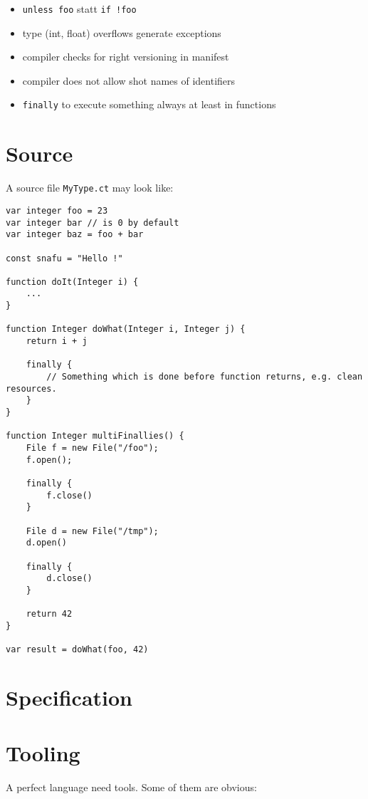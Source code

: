 \documentclass[11pt,a4paper]{report}
\begin{document}
\begin{itemize}
    \item \texttt{unless foo} statt \texttt{if !foo}
    \item type (int, float) overflows generate exceptions
    \item compiler checks for right versioning in manifest
    \item compiler does not allow shot names of identifiers
    \item \texttt{finally} to execute something always at least in functions
\end{itemize}

\section{Source}

A source file \texttt{MyType.ct} may look like:

\begin{lstlisting}[language=CayThe]
var integer foo = 23
var integer bar // is 0 by default
var integer baz = foo + bar

const snafu = "Hello !"

function doIt(Integer i) {
    ...
}

function Integer doWhat(Integer i, Integer j) {
    return i + j
    
    finally {
        // Something which is done before function returns, e.g. clean resources.
    }
}

function Integer multiFinallies() {
    File f = new File("/foo");
    f.open();

    finally {
        f.close()
    }

    File d = new File("/tmp");
    d.open()

    finally {
        d.close()
    }

    return 42
}

var result = doWhat(foo, 42)	
\end{lstlisting}

\section{Specification}

\section{Tooling}

A perfect language need tools. Some of them are obvious:
\end{document}
